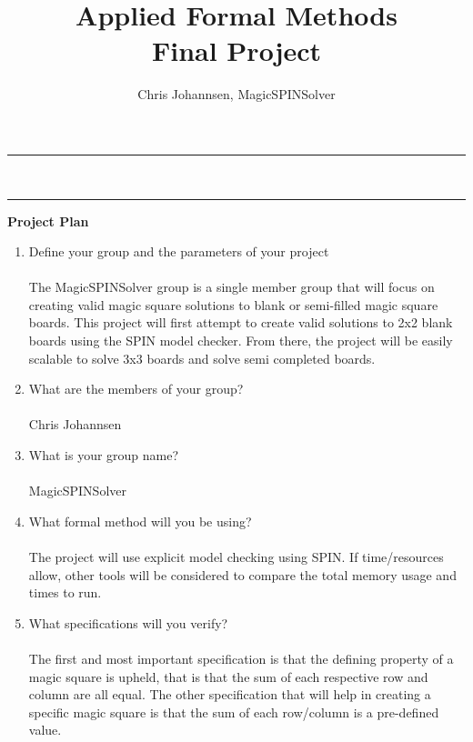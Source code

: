 \documentclass[12pt]{article}
\newcommand{\HRule}{\rule{\linewidth}{0.2mm}}
\begin{document}
\title{Applied Formal Methods\\ Final Project}

\author{Chris Johannsen, MagicSPINSolver}

\maketitle

\begin{spacing}{0.5}
\noindent \HRule \\
\noindent \HRule
\end{spacing}

\bigskip 

{\bf Project Plan}\\
\begin{enumerate}
\item Define your group and the parameters of your project\\
\\
The MagicSPINSolver group is a single member group that will focus on creating valid magic square solutions to blank or semi-filled magic square boards. This project will first attempt to create valid solutions to 2x2 blank boards using the SPIN model checker. From there, the project will be easily scalable to solve 3x3 boards and solve semi completed boards.
\\
\item What are the members of your group?\\
\\
Chris Johannsen
\\
\item What is your group name?\\
\\
MagicSPINSolver
\\
\item What formal method will you be using?\\
\\
The project will use explicit model checking using SPIN. If time/resources allow, other tools will be considered to compare the total memory usage and times to run.
\\
\item What specifications will you verify?\\
\\
The first and most important specification is that the defining property of a magic square is upheld, that is that the sum of each respective row and column are all equal. The other specification that will help in creating a specific magic square is that the sum of each row/column is a pre-defined value.

\end{enumerate}
\end{document}
